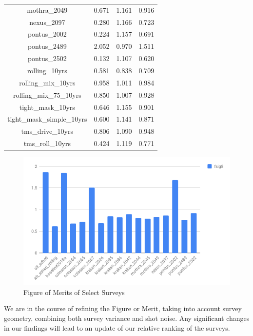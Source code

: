 \documentclass{aastex62}   	%
\begin{document}
\begin{table}
\begin{tabular}{|c|rrr|}
mothra\_2049  & 0.671 & 1.161 & 0.916  \\
nexus\_2097  & 0.280 & 1.166 & 0.723  \\
pontus\_2002  & 0.224 & 1.157 & 0.691  \\
pontus\_2489  & 2.052 & 0.970 & 1.511  \\
pontus\_2502  & 0.132 & 1.107 & 0.620  \\
rolling\_10yrs  & 0.581 & 0.838 & 0.709  \\
rolling\_mix\_10yrs  & 0.958 & 1.011 & 0.984  \\
rolling\_mix\_75\_10yrs  & 0.850 & 1.007 & 0.928  \\
tight\_mask\_10yrs  & 0.646 & 1.155 & 0.901  \\
tight\_mask\_simple\_10yrs  & 0.600 & 1.141 & 0.871  \\
tms\_drive\_10yrs  & 0.806 & 1.090 & 0.948  \\
tms\_roll\_10yrs  & 0.424 & 1.119 & 0.771  \\
\hline
\end{tabular}
\end{table}

\begin{figure}[htbp]
   \centering
   \includegraphics[scale=0.5]{chart.png} %
   \caption{Figure of Merits of Select Surveys}
   \label{fig:fom}
\end{figure}

We are in the course of refining the Figure or Merit, taking into account survey geometry, combining both survey variance and shot noise.
Any significant changes in our findings will lead to an update of our relative
ranking of the surveys.
\end{document}
